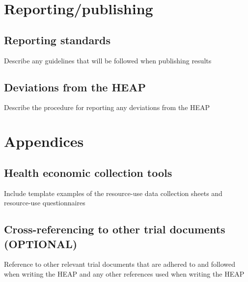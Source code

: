 \section{Reporting/publishing}

\subsection{Reporting standards}

Describe any guidelines that will be followed when publishing results


\subsection{Deviations from the HEAP}

Describe the procedure for reporting any deviations from the HEAP


\section{Appendices}


\subsection{Health economic collection tools}

Include template examples of the resource-use data collection sheets
and resource-use questionnaires


\subsection{Cross-referencing to other trial documents (OPTIONAL)}

Reference to other relevant trial documents that are adhered to and
followed when writing the HEAP and any other references used when
writing the HEAP



